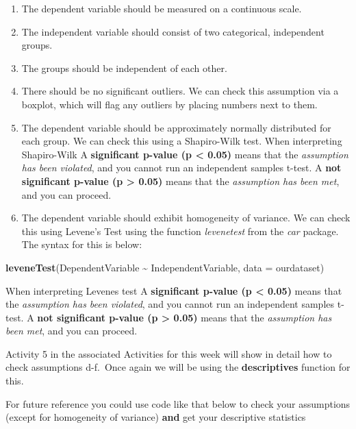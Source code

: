 \documentclass[
]{book}
\newenvironment{Shaded}{\begin{snugshade}}{\end{snugshade}}
\newcommand{\AttributeTok}[1]{\textcolor[rgb]{0.13,0.29,0.53}{#1}}
\newcommand{\FunctionTok}[1]{\textcolor[rgb]{0.13,0.29,0.53}{\textbf{#1}}}
\newcommand{\NormalTok}[1]{#1}
\newcommand{\SpecialCharTok}[1]{\textcolor[rgb]{0.81,0.36,0.00}{\textbf{#1}}}
\begin{document}
\begin{enumerate}
\def\labelenumi{\alph{enumi}.}
\item
  The dependent variable should be measured on a continuous scale.
\item
  The independent variable should consist of two categorical, independent groups.
\item
  The groups should be independent of each other.
\item
  There should be no significant outliers. We can check this assumption via a boxplot, which will flag any outliers by placing numbers next to them.
\item
  The dependent variable should be approximately normally distributed for each group. We can check this using a Shapiro-Wilk test. When interpreting Shapiro-Wilk A \textbf{significant p-value (p \textless{} 0.05)} means that the \emph{assumption has been violated}, and you cannot run an independent samples t-test. A \textbf{not significant p-value (p \textgreater{} 0.05)} means that the \emph{assumption has been met}, and you can proceed.
\item
  The dependent variable should exhibit homogeneity of variance. We can check this using Levene's Test using the function \emph{levenetest} from the \emph{car} package. The syntax for this is below:
\end{enumerate}

\begin{Shaded}
\begin{Highlighting}[]
\FunctionTok{leveneTest}\NormalTok{(DependentVariable }\SpecialCharTok{\textasciitilde{}}\NormalTok{ IndependentVariable, }\AttributeTok{data =}\NormalTok{ ourdataset)}
\end{Highlighting}
\end{Shaded}

When interpreting Levenes test A \textbf{significant p-value (p \textless{} 0.05)} means that the \emph{assumption has been violated}, and you cannot run an independent samples t-test. A \textbf{not significant p-value (p \textgreater{} 0.05)} means that the \emph{assumption has been met}, and you can proceed.

Activity 5 in the associated Activities for this week will show in detail how to check assumptions d-f.~Once again we will be using the \textbf{descriptives} function for this.

For future reference you could use code like that below to check your assumptions (except for homogeneity of variance) \textbf{and} get your descriptive statistics
\end{document}

